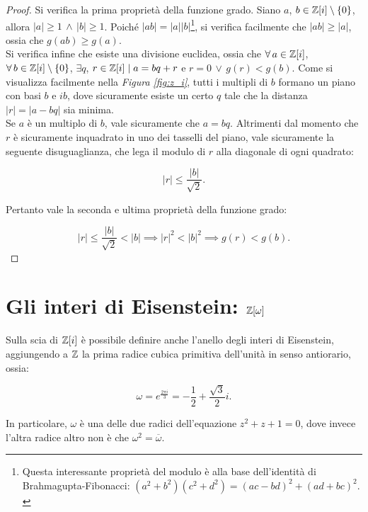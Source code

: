 \begin{proof}
    Si verifica la prima proprietà della funzione grado. Siano $a$, $b \in \mathbb Z[i] \setminus \{0\}$,
    allora $\left|a\right| \geq 1 \,\land\, \left|b\right| \geq 1$. Poiché
    $\left|ab\right| = \left|a\right|\left|b\right|$\footnote{Questa interessante proprietà del modulo è alla base dell'identità di Brahmagupta-Fibonacci: $(a^2 + b^2)(c^2 + d^2) = (ac-bd)^2 + (ad+bc)^2.$}, si verifica facilmente che
    $\left|ab\right| \geq \left|a\right|$, ossia che $g(ab) \geq g(a)$. \\

    Si verifica infine che esiste una divisione euclidea, ossia che
    $\forall a \in \ZZ[i]$, $\forall b \in \ZZ[i] \setminus \{0\}$, $\exists q$, $r \in \mathbb Z[i] \mid a = bq + r$ e $r=0 \,\lor\, g(r) < g(b)$.
    Come si visualizza facilmente nella \textit{Figura \ref{fig:z_i}},
    tutti i multipli di $b$ formano un piano con basi $b$ e $ib$, dove
    sicuramente esiste un certo $q$ tale che la distanza $\left|r\right| = \left|a-bq\right|$ sia minima. \\

    Se $a$ è un multiplo di $b$, vale sicuramente che $a = bq$. Altrimenti dal momento che $r$ è sicuramente inquadrato in uno dei tasselli del piano, vale
    sicuramente la seguente disuguaglianza, che lega il modulo di $r$ alla diagonale di
    ogni quadrato:

    \[\left|r\right| \leq \frac{\left|b\right|}{\sqrt{2}}.\]

    Pertanto vale la seconda e ultima proprietà della funzione grado:

    \[\left|r\right| \leq \frac{\left|b\right|}{\sqrt{2}} < \left|b\right| \implies \left|r\right|^2 < \left|b\right|^2 \implies g(r) < g(b).\]
\end{proof}

\section{Gli interi di Eisenstein: \texorpdfstring{$\mathbb Z[\omega]$}{Z[ω]}}

Sulla scia di $\mathbb Z[i]$ è possibile definire anche l'anello degli
interi di Eisenstein, aggiungendo a $\mathbb Z$ la prima radice cubica
primitiva dell'unità in senso antiorario, ossia:

\[\omega = e^{\frac{2\pi i}{3}} = -\frac{1}{2} + \frac{\sqrt{3}}{2}i.\]

In particolare, $\omega$ è una delle due radici dell'equazione
$z^2 + z + 1 = 0$, dove invece l'altra radice altro non è che
$\omega^2 = \overline{\omega}$.

